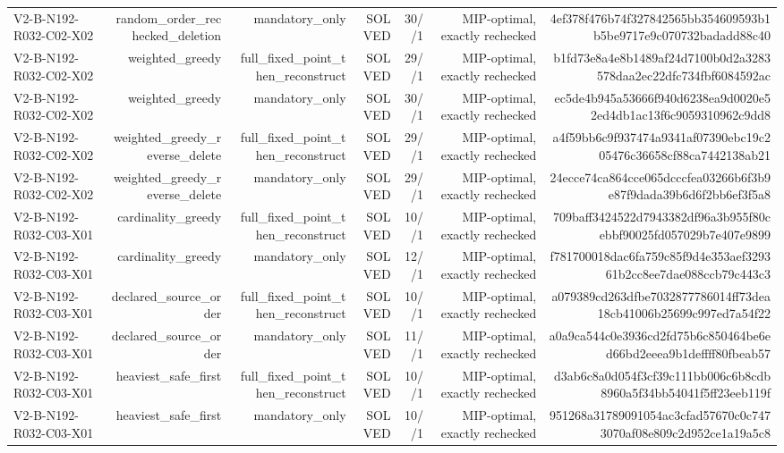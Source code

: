 {\begin{longtable}{lrrrrrr}
V2-B-N192-R032-C02-X02 & random\_order\_rechecked\_deletion & mandatory\_only & SOLVED & 30//1 & MIP-optimal, exactly rechecked & 4ef378f476b74f327842565bb354609593b1b5be9717e9c070732badadd88c40 \\
V2-B-N192-R032-C02-X02 & weighted\_greedy & full\_fixed\_point\_then\_reconstruct & SOLVED & 29//1 & MIP-optimal, exactly rechecked & b1fd73e8a4e8b1489af24d7100b0d2a3283578daa2ec22dfc734fbf6084592ac \\
V2-B-N192-R032-C02-X02 & weighted\_greedy & mandatory\_only & SOLVED & 30//1 & MIP-optimal, exactly rechecked & ec5de4b945a53666f940d6238ea9d0020e52ed4db1ac13f6c9059310962c9dd8 \\
V2-B-N192-R032-C02-X02 & weighted\_greedy\_reverse\_delete & full\_fixed\_point\_then\_reconstruct & SOLVED & 29//1 & MIP-optimal, exactly rechecked & a4f59bb6c9f937474a9341af07390ebc19c205476c36658cf88ca7442138ab21 \\
V2-B-N192-R032-C02-X02 & weighted\_greedy\_reverse\_delete & mandatory\_only & SOLVED & 29//1 & MIP-optimal, exactly rechecked & 24ecce74ca864cce065dcccfea03266b6f3b9e87f9dada39b6d6f2bb6ef3f5a8 \\
V2-B-N192-R032-C03-X01 & cardinality\_greedy & full\_fixed\_point\_then\_reconstruct & SOLVED & 10//1 & MIP-optimal, exactly rechecked & 709baff3424522d7943382df96a3b955f80cebbf90025fd057029b7e407e9899 \\
V2-B-N192-R032-C03-X01 & cardinality\_greedy & mandatory\_only & SOLVED & 12//1 & MIP-optimal, exactly rechecked & f781700018dac6fa759c85f9d4e353aef329361b2cc8ee7dae088ccb79c443c3 \\
V2-B-N192-R032-C03-X01 & declared\_source\_order & full\_fixed\_point\_then\_reconstruct & SOLVED & 10//1 & MIP-optimal, exactly rechecked & a079389cd263dfbe7032877786014ff73dea18cb41006b25699c997ed7a54f22 \\
V2-B-N192-R032-C03-X01 & declared\_source\_order & mandatory\_only & SOLVED & 11//1 & MIP-optimal, exactly rechecked & a0a9ca544c0e3936cd2fd75b6c850464be6ed66bd2eeea9b1deffff80fbeab57 \\
V2-B-N192-R032-C03-X01 & heaviest\_safe\_first & full\_fixed\_point\_then\_reconstruct & SOLVED & 10//1 & MIP-optimal, exactly rechecked & d3ab6c8a0d054f3cf39c111bb006c6b8cdb8960a5f34bb54041f5ff23eeb119f \\
V2-B-N192-R032-C03-X01 & heaviest\_safe\_first & mandatory\_only & SOLVED & 10//1 & MIP-optimal, exactly rechecked & 951268a31789091054ac3cfad57670c0c7473070af08e809c2d952ce1a19a5c8 \\

\end{longtable}}

